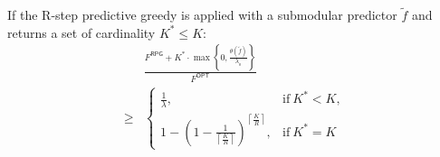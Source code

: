 \begin{theorem}  \label{thm:bounds-on-RPG-submodular-predictors}
If the R-step predictive greedy is applied with a submodular predictor $\tilde{f}$ and returns a set of cardinality $K^* \leq K$: 
\begin{align*}
& \frac{F^{\textsf{RPG}} + K^* \cdot \max \left\{ 0, \frac{\theta(\tilde{f})}{\lambda_o} \right\}}{F^{\textsf{OPT}}} \\
\geq&
\begin{cases}
\frac{1}{\lambda}, & \text{if}~ K^* < K, \\
1 - \left( 1 - \frac{1}{\left\lceil \frac{K}{R} \right\rceil} \right)^{\left\lceil \frac{K}{R} \right\rceil}, & \text{if}~ K^* = K
\end{cases}
\end{align*}
\end{theorem}
